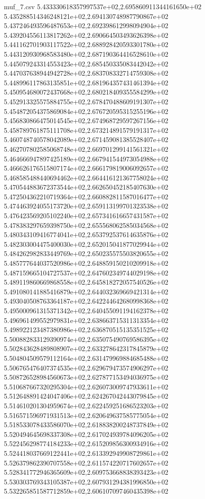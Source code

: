 \begin{filecontents*}{muf_7.csv}
5.433330618357997537e+02,2.695860911344161650e+02
5.435288514346248121e+02,2.694130748987790867e+02
5.437246493596487653e+02,2.692398612998094904e+02
5.439204556113817262e+02,2.690664503493626398e+02
5.441162701903117522e+02,2.688928420593301780e+02
5.443120930968583480e+02,2.687190364416528610e+02
5.445079243314553423e+02,2.685450335083442042e+02
5.447037638944942728e+02,2.683708332714759308e+02
5.448996117863135851e+02,2.681964357431461394e+02
5.450954680072437668e+02,2.680218409355584299e+02
5.452913325575884755e+02,2.678470488609191307e+02
5.454872054375869084e+02,2.676720595315255196e+02
5.456830866475014545e+02,2.674968729597267156e+02
5.458789761875111708e+02,2.673214891579191317e+02
5.460748740578042089e+02,2.671459081385528407e+02
5.462707802585068748e+02,2.669701299141561321e+02
5.464666947897425189e+02,2.667941544973054988e+02
5.466626176515807174e+02,2.666179819006092657e+02
5.468585488440694462e+02,2.664416121367758024e+02
5.470544883672373544e+02,2.662650452185407630e+02
5.472504362210719364e+02,2.660882811587016477e+02
5.474463924055173720e+02,2.659113199701323538e+02
5.476423569205102240e+02,2.657341616657431587e+02
5.478383297659398750e+02,2.655568062585034568e+02
5.480343109416774041e+02,2.653792537614635876e+02
5.482303004475400030e+02,2.652015041877029944e+02
5.484262982833449769e+02,2.650235575503820655e+02
5.485777644037520986e+02,2.648859150210209918e+02
5.487159665104727537e+02,2.647602349744029198e+02
5.489119860669868558e+02,2.645818272057540526e+02
5.491080141885416879e+02,2.644032369669421314e+02
5.493040508763364187e+02,2.642244642680998368e+02
5.495000961315371342e+02,2.640455091194162378e+02
5.496961499552979831e+02,2.638663715311313354e+02
5.498922123487380986e+02,2.636870515135351525e+02
5.500882833129390974e+02,2.635075490769586395e+02
5.502843628489808907e+02,2.633278642317845879e+02
5.504804509579112164e+02,2.631479969884685488e+02
5.506765476407374535e+02,2.629679473574906297e+02
5.508726528984560673e+02,2.627877153494036975e+02
5.510687667320295304e+02,2.626073009747933611e+02
5.512648891424047406e+02,2.624267042443079845e+02
5.514610201304959674e+02,2.622459251686523203e+02
5.516571596971931513e+02,2.620649637585775054e+02
5.518533078433586070e+02,2.618838200248737849e+02
5.520494645698337308e+02,2.617024939784096205e+02
5.522456298774184233e+02,2.615209856300934916e+02
5.524418037669122441e+02,2.613392949908729861e+02
5.526379862390707558e+02,2.611574220717602657e+02
5.528341772946365609e+02,2.609753668838393423e+02
5.530303769343105387e+02,2.607931294381996850e+02
5.532265851587712859e+02,2.606107097460435398e+02

\end{filecontents*}
